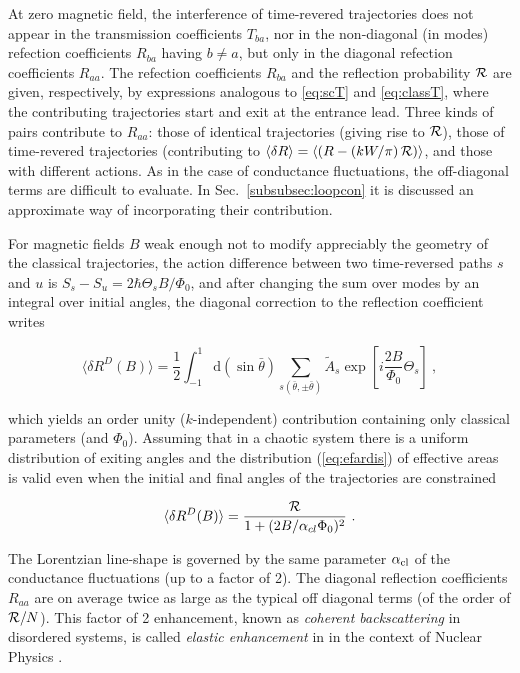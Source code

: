 \documentclass[a4paper,10pt]{article}
\newcommand{\dif}{\mathrm{d}}
\newcommand{\nin}{\noindent}
\def\btheta{\bar {\theta}}
\newcommand{\be}{\begin{equation}}
\newcommand{\ee}{\end{equation}}
\newcommand{\dlR}{\delta R}
\newcommand{\alc}{\alpha_{\rm cl}}
\begin{document}
\nin At zero magnetic field, the interference of time-revered trajectories does not appear in the transmission coefficients $T_{ba}$, nor in the non-diagonal (in modes) refection coefficients $R_{ba}$ having $b \ne a$, but only in the diagonal refection coefficients $R_{aa}$. The refection coefficients $R_{ba}$ and the reflection probability ${\cal R}$ are given, respectively, by expressions analogous to \eqref{eq:scT} and \eqref{eq:classT}, where the contributing trajectories start and exit at the entrance lead. Three kinds of pairs contribute to $R_{aa}$: those of identical trajectories (giving rise to ${\cal R}$), those of time-revered trajectories (contributing to 
$\langle \dlR \rangle = \left\langle \left(R - \left(kW/\pi\right) 
{\cal R} \right) \right\rangle$, and those with different actions. As in the case of conductance fluctuations, the off-diagonal terms are difficult to evaluate. In Sec.~\ref{subsubsec:loopcon} it is discussed an approximate way of incorporating  their contribution. 

\nin For magnetic fields $B$ weak enough not to modify appreciably the geometry of the classical trajectories, the action difference between two time-reversed paths $s$ and $u$ is $S_s-S_u = 2\hbar\Theta_sB/\Phi_0$, and  after changing the sum over modes by an integral over initial angles, the diagonal correction to the reflection coefficient writes 

\be
\langle \delta R^D(B) \rangle = \frac{1}{2} \int_{-1}^{1} \dif(\sin\btheta)
\sum_{s( \btheta,\pm \btheta)} \tilde{A}_s \exp{\left[i \frac{2 B}{\Phi_0} \Theta_s \right]} \ ,
\label{eq:rd1}
\ee

\nin which yields an order unity ($k$-independent) contribution containing only classical parameters (and $\Phi_0$). Assuming that in a chaotic system  there is a uniform distribution of exiting angles and the distribution
(\ref{eq:efardis}) of effective areas is valid  even when the
initial and final angles of the trajectories are constrained \cite{Bar93}

\be
\langle \delta R^D(B) \rangle = \frac{{\cal R}}{1 + (2B/ \alpha_{cl} \Phi_0 )^2} \ .
\label{eq:wlfr}
\ee

\nin The Lorentzian line-shape is governed by the same parameter
$\alc$ of the conductance fluctuations (up to a factor of 2). The diagonal reflection coefficients $R_{aa}$ are on average twice as large as the typical off diagonal terms (of the order of ${\cal R}/N$). This factor of 2 enhancement, known as {\it coherent backscattering} in disordered systems, is called {\it elastic enhancement} in in the context of Nuclear Physics \cite{Iid90,Wei91}. 
\end{document}
